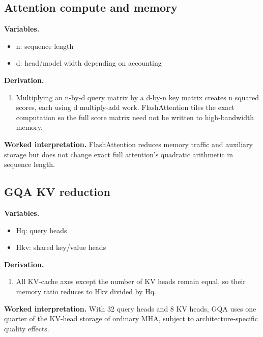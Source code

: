 \subsection{Attention compute and memory}
\textbf{Variables.}\begin{itemize}
\item n: sequence length
\item d: head/model width depending on accounting
\end{itemize}
\textbf{Derivation.}\begin{derivation}\begin{enumerate}
\item Multiplying an n-by-d query matrix by a d-by-n key matrix creates n squared scores, each using d multiply-add work. FlashAttention tiles the exact computation so the full score matrix need not be written to high-bandwidth memory.
\end{enumerate}\end{derivation}
\textbf{Worked interpretation.} FlashAttention reduces memory traffic and auxiliary storage but does not change exact full attention's quadratic arithmetic in sequence length.
\subsection{GQA KV reduction}
\textbf{Variables.}\begin{itemize}
\item Hq: query heads
\item Hkv: shared key/value heads
\end{itemize}
\textbf{Derivation.}\begin{derivation}\begin{enumerate}
\item All KV-cache axes except the number of KV heads remain equal, so their memory ratio reduces to Hkv divided by Hq.
\end{enumerate}\end{derivation}
\textbf{Worked interpretation.} With 32 query heads and 8 KV heads, GQA uses one quarter of the KV-head storage of ordinary MHA, subject to architecture-specific quality effects.
